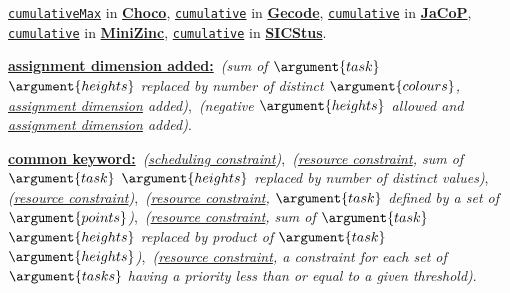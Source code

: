 \begin{ctrdesc}
\item[\pdfmarkup{subject={Systems},color=white,markup=Highlight}{Systems}{References to the constraint in some concrete constraint programming systems.}
]
\href{http://www.emn.fr/z-info/choco-solver/tex/documentation/choco-doc.pdf}{\texttt{cumulativeMax}} in \href{http://choco.emn.fr/}{{\bf Choco}},
\href{http://www.gecode.org/doc/3.7.0/reference/group__TaskModelIntScheduling.html}{\texttt{cumulative}} in \href{http://www.gecode.org/}{{\bf Gecode}},
\href{http://jacopapi.osolpro.com/JaCoP/constraints/Cumulative.html}{\texttt{cumulative}} in \href{http://www.jacop.eu/}{{\bf JaCoP}},
\href{http://www.g12.cs.mu.oz.au/minizinc/downloads/doc-1.4/mzn-globals.html#cumulative}{\texttt{cumulative}} in \href{http://www.g12.cs.mu.oz.au/minizinc/}{{\bf MiniZinc}},
\href{http://www.sics.se/sicstus/docs/latest4/html/sicstus.html/Combinatorial-Constraints.html}{\texttt{cumulative}} in \href{http://www.sics.se/sicstus/}{{\bf SICStus}}.
\item[\pdfmarkup{subject={See also},color=white,markup=Highlight}{See also}{Related constraints grouped by semantics links.}
\hypertarget{CcumulativePlinks}{}
]
\hyperlink{Lassignment_dimension_added}{{\bf assignment dimension added:}}
\hyperlink{Ccoloured_cumulatives}{}\,\emph{(sum of $\argument{task}$ $\argument{heights}$ replaced by number of distinct $\argument{colours}$, \hyperlink{assignment_dimension}{assignment dimension} added)},
\hyperlink{Ccumulatives}{}\,\emph{(negative $\argument{heights}$ allowed and \hyperlink{assignment_dimension}{assignment dimension} added)}.

\hyperlink{Lcommon_keyword}{{\bf common keyword:}}
\hyperlink{Ccalendar}{}\,\emph{(\hyperlink{scheduling_constraint}{scheduling constraint})},
\hyperlink{Ccoloured_cumulative}{}\,\emph{(\hyperlink{resource_constraint}{resource constraint}, sum of $\argument{task}$ $\argument{heights}$ replaced by number of distinct values)},
\hyperlink{Ccoloured_cumulatives}{}\,\emph{(\hyperlink{resource_constraint}{resource constraint})},
\hyperlink{Ccumulative_convex}{}\,\emph{(\hyperlink{resource_constraint}{resource constraint}, $\argument{task}$ defined by a set of $\argument{points}$)},
\hyperlink{Ccumulative_product}{}\,\emph{(\hyperlink{resource_constraint}{resource constraint}, sum of $\argument{task}$ $\argument{heights}$ replaced by product of $\argument{task}$ $\argument{heights}$)},
\hyperlink{Ccumulative_with_level_of_priority}{}\,\emph{(\hyperlink{resource_constraint}{resource constraint}, a \hyperlink{Ccumulative}{} constraint for each set of $\argument{tasks}$ having a priority less than or equal to a given threshold)}.


\end{ctrdesc}
